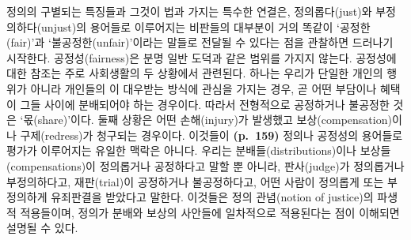 정의의 구별되는 특징들과 그것이 법과 가지는 특수한 연결은,
정의롭다(just)와 부정의하다(unjust)의 용어들로 이루어지는 비판들의
대부분이 거의 똑같이 ‘공정한(fair)’과 ‘불공정한(unfair)’이라는 말들로
전달될 수 있다는 점을 관찰하면 드러나기 시작한다. 공정성(fairness)은
분명 일반 도덕과 같은 범위를 가지지 않는다. 공정성에 대한 참조는 주로
사회생활의 두 상황에서 관련된다. 하나는 우리가 단일한 개인의 행위가
아니라 개인들의 이 대우받는 방식에 관심을 가지는
경우, 곧 어떤 부담이나 혜택이 그들 사이에 분배되어야 하는 경우이다.
따라서 전형적으로 공정하거나 불공정한 것은 ‘몫(share)’이다. 둘째 상황은
어떤 손해(injury)가 발생했고 보상(compensation)이나 구제(redress)가
청구되는 경우이다. 이것들이 \textbf{(p.~159)} 정의나 공정성의 용어들로
평가가 이루어지는 유일한 맥락은 아니다. 우리는 분배들(distributions)이나
보상들(compensations)이 정의롭거나 공정하다고 말할 뿐 아니라,
판사(judge)가 정의롭거나 부정의하다고, 재판(trial)이 공정하거나
불공정하다고, 어떤 사람이 정의롭게 또는 부정의하게 유죄판결을 받았다고
말한다. 이것들은 정의 관념(notion of justice)의 파생적 적용들이며,
정의가 분배와 보상의 사안들에 일차적으로 적용된다는 점이 이해되면 설명될
수 있다.


